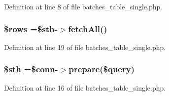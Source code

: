 Definition at line 8 of file batches\-\_\-table\-\_\-single.\-php.

\hypertarget{batches__table__single_8php_ace2ec39e7df3899fa8df9640ec274b03}{
\subsubsection[{\$rows}]{\setlength{\rightskip}{0pt plus 5cm}\$rows =\$sth-\/$>$fetch\-All()}}\label{batches__table__single_8php_ace2ec39e7df3899fa8df9640ec274b03}


Definition at line 19 of file batches\-\_\-table\-\_\-single.\-php.

\hypertarget{batches__table__single_8php_afa9126f9664959c02795be300a135f93}{
\subsubsection[{\$sth}]{\setlength{\rightskip}{0pt plus 5cm}\$sth =\$conn-\/$>$prepare(\$query)}}\label{batches__table__single_8php_afa9126f9664959c02795be300a135f93}


Definition at line 16 of file batches\-\_\-table\-\_\-single.\-php.

